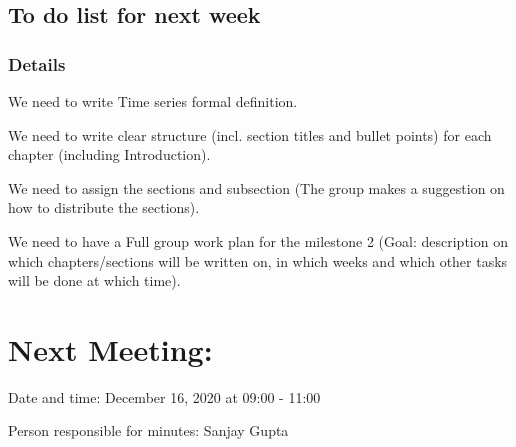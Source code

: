 \documentclass[11pt]{meetingmins} %
\begin{document}
\subsection{To do list for next week}
    \subsubsection{Details}
        \begin{hiddensubitems}
            \item
              We need to write Time series formal definition.
             \item
             We need to write clear structure (incl. section titles and bullet points) for each chapter (including Introduction).
             \item We need to assign the sections and subsection (The group makes a suggestion on how to distribute the sections).
             \item
             We need to have a Full group work plan for the milestone 2 (Goal: description on which chapters/sections will be written on, in which weeks and which other tasks will be done at which time).
             
        \end{hiddensubitems}
    
\section{Next Meeting:}
    \begin{hiddensubitems}
        \item
            Date and time: December 16, 2020 at 09:00 - 11:00
        \item
            Person responsible for minutes: Sanjay Gupta
    \end{hiddensubitems}
\end{document}
